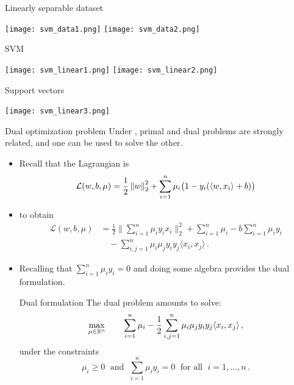 \documentclass[xcolor={usenames,dvipsnames}]{beamer}
\begin{document}
\begin{frame}{Linearly separable dataset}
\begin{center}
\texttt{[image: svm\_data1.png]}
\texttt{[image: svm\_data2.png]}
\end{center}
\end{frame}


\begin{frame}{SVM}
\begin{center}
\texttt{[image: svm\_linear1.png]}
\texttt{[image: svm\_linear2.png]}
\end{center}
\end{frame}

\begin{frame}{Support vectors}
\begin{center}
\texttt{[image: svm\_linear3.png]}
\end{center}
\end{frame}



  \begin{frame}[allowframebreaks]{Dual optimization problem}
Under , primal and dual problems are strongly related, and one can be used to solve the other.


\begin{itemize}
\item  Recall that the Lagrangian is
  \begin{equation*}
    \mathcal{L}(w, b, \mu) = \frac 12 \left\| w \right\|_2^2 + \sum_{i=1}^n \mu_i \big(1 - y_i( \langle {w, x_i} \rangle  + b) \big)
  \end{equation*}  
\item   {} to obtain
  \begin{align*}
    \mathcal{L}(w, b, \mu) &= \frac 12 \Big\| \sum_{i=1}^n \mu_i y_i x_i \Big\|_2^2 
    + \sum_{i=1}^n \mu_i - b \sum_{i=1}^n \mu_i y_i \\
       &\quad - \sum_{i, j=1}^n \mu_i \mu_j y_i y_j \langle {x_i, x_j} \rangle \,.
  \end{align*}
 \item  Recalling that $\sum_{i=1}^n \mu_i y_i = 0$ and doing some algebra provides the dual formulation.

\begin{block}{Dual formulation}
The dual problem amounts to solve:
$$
   \max_{\mu \in \mathbb{R}^n} \quad \quad \sum_{i=1}^n \mu_i - \frac 12 \sum_{i, j=1}^n \mu_i \mu_j y_i y_j \langle {x_i, x_j} \rangle\,,
$$
under \alert{the constraints}
$$
\mu_i \geq 0 \; \text{ and } \;  \sum_{i=1}^n \mu_i y_i  = 0 \; \text{ for all } \; i=1, \ldots, n\,.
$$
  \end{block}
  \end{itemize}

\end{frame}
\end{document}
